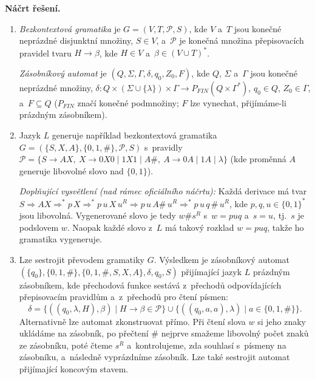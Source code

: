 \medskip
\noindent\textbf{Náčrt řešení.}\par
\begin{enumerate}
\item \textit{Bezkontextová gramatika} je $G = (V, T, \mathcal{P}, S)$, kde $V$ a~$T$
  jsou konečné neprázdné disjunktní množiny, $S \in V$, a~$\mathcal{P}$ je konečná
  množina přepisovacích pravidel tvaru $H \to \beta$, kde $H \in V$ a~$\beta \in
  (V \cup T)^*$.

  \textit{Zásobníkový automat} je $(Q, \Sigma, \Gamma, \delta, q_0, Z_0, F)$, kde $Q$,
  $\Sigma$ a~$\Gamma$ jsou konečné neprázdné množiny, $\delta\colon Q \times (\Sigma
  \cup \{\lambda\}) \times \Gamma \to P_{FIN}(Q \times \Gamma^*)$, $q_0 \in Q$,
  $Z_0 \in \Gamma$, a~$F \subseteq Q$ ($P_{FIN}$ značí konečné podmnožiny; $F$ lze
  vynechat, přijímáme-li prázdným zásobníkem).

\item Jazyk $L$ generuje například bezkontextová gramatika $G = (\{S, X, A\},
  \{0, 1, \#\}, \mathcal{P}, S)$ s~pravidly $\mathcal{P} = \{S \to AX,\ X \to
  0X0 \mid 1X1 \mid A\#,\ A \to 0A \mid 1A \mid \lambda\}$ (kde proměnná $A$ generuje
  libovolné slovo nad $\{0, 1\}$).

  \textit{Doplňující vysvětlení (nad rámec oficiálního náčrtu):} Každá derivace má
  tvar $S \Rightarrow AX \Rightarrow^* p\,X \Rightarrow^* p\,u\,X\,u^R \Rightarrow
  p\,u\,A\#\,u^R \Rightarrow^* p\,u\,q\,\#\,u^R$, kde $p, q, u \in \{0,1\}^*$ jsou
  libovolná. Vygenerované slovo je tedy $w\#s^R$ s~$w = puq$ a~$s = u$, tj.\ $s$ je
  podslovem $w$. Naopak každé slovo z~$L$ má takový rozklad $w = puq$, takže ho
  gramatika vygeneruje.

\item Lze sestrojit převodem gramatiky $G$. Výsledkem je zásobníkový automat
  $(\{q_0\},\allowbreak \{0, 1, \#\},\allowbreak \{0, 1, \#, S, X, A\},\allowbreak \delta, q_0, S)$ přijímající jazyk
  $L$ prázdným zásobníkem, kde přechodová funkce sestává z~přechodů odpovídajících
  přepisovacím pravidlům a~z~přechodů pro čtení písmen:
  \[ \delta = \{((q_0, \lambda, H), \beta) \mid H \to \beta \in \mathcal{P}\} \cup
     \{((q_0, a, a), \lambda) \mid a \in \{0, 1, \#\}\}. \]
  Alternativně lze automat zkonstruovat přímo. Při čtení slova $w$ si jeho znaky
  ukládáme na zásobník, po přečtení $\#$ nejprve smažeme libovolný počet znaků ze
  zásobníku, poté čteme $s^R$ a~kontrolujeme, zda souhlasí s~písmeny na zásobníku,
  a~následně vyprázdníme zásobník. Lze také sestrojit automat přijímající koncovým
  stavem.
\end{enumerate}
